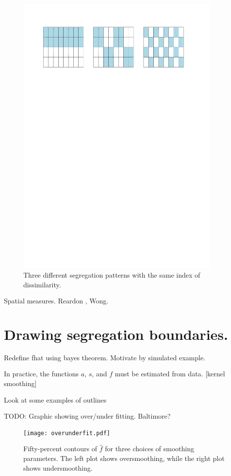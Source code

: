 \documentclass{article}
\theoremstyle{theorem}
\theoremstyle{definition}
\begin{document}
\begin{figure}\centering
  \includegraphics[width=4in]{checkerboard.pdf}
  \caption{Three different segregation patterns with the same index of dissimilarity.}
  \label{fig:checkerboard}
\end{figure}

Spatial measures. Reardon \cite{reardonosullivan04}, Wong.

\section{Drawing segregation boundaries.}

Redefine fhat using bayes theorem. Motivate by simulated example.

In practice, the functions $a$, $s$, and $f$ must be estimated from data. [kernel smoothing] \cite{wandjones11}

Look at some examples of outlines

TODO: Graphic showing over/under fitting. Baltimore?

\begin{figure}
  \texttt{[image: overunderfit.pdf]}
  \caption{Fifty-percent contours of $\hat{f}$ for three choices of smoothing parameters. The left plot shows oversmoothing, while the right plot shows undersmoothing.}
  \label{fig:overunderfit}
\end{figure}
\end{document}
